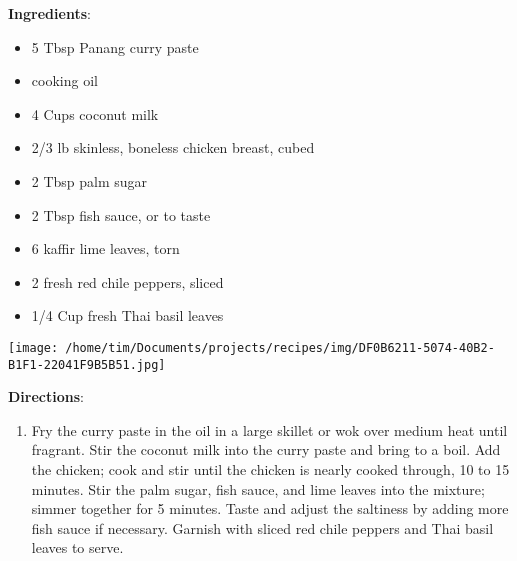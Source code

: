 \documentclass[11pt, twoside, openany]{book}
\begin{document}
\begin{minipage}[t]{0.8\linewidth}
\textbf{Ingredients}:\vspace{-3mm}
\begin{multicols}{2}
\begin{itemize}\setlength\itemsep{-1mm}
\item 5 Tbsp Panang curry paste
\item cooking oil
\item 4 Cups coconut milk
\item 2/3 lb skinless, boneless chicken breast, cubed
\item 2 Tbsp palm sugar
\item 2 Tbsp fish sauce, or to taste
\item 6 kaffir lime leaves, torn
\item 2 fresh red chile peppers, sliced
\item 1/4 Cup fresh Thai basil leaves
\end{itemize}
\end{multicols}
\end{minipage}
\begin{minipage}[t]{0.2\linewidth}
\centering \strut\vspace*{-\baselineskip}\newline
\texttt{[image: /home/tim/Documents/projects/recipes/img/DF0B6211-5074-40B2-B1F1-22041F9B5B51.jpg]}\\
\end{minipage}\vspace{3mm}
\textbf{Directions}:
\vspace{-3mm}\begin{enumerate}\setlength\itemsep{-1mm}
\item Fry the curry paste in the oil in a large skillet or wok over medium heat until fragrant. Stir the coconut milk into the curry paste and bring to a boil. Add the chicken; cook and stir until the chicken is nearly cooked through, 10 to 15 minutes. Stir the palm sugar, fish sauce, and lime leaves into the mixture; simmer together for 5 minutes. Taste and adjust the saltiness by adding more fish sauce if necessary. Garnish with sliced red chile peppers and Thai basil leaves to serve.
\end{enumerate}
 \label{chocolate-coconut-candies-recipe}\hfill\textit{}\\
\end{document}
